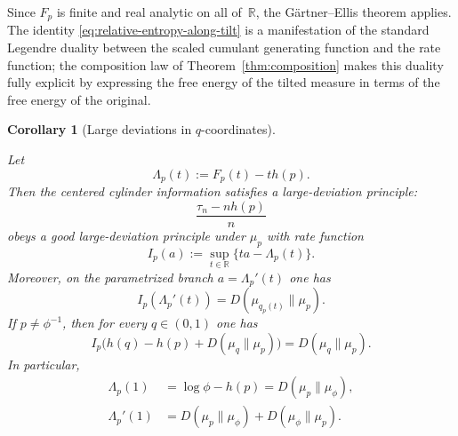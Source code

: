 \documentclass[pdflatex,sn-basic,Numbered]{sn-jnl}
\theoremstyle{thmstyleone}
\newtheorem{corollary}[theorem]{Corollary}
\theoremstyle{thmstyletwo}
\theoremstyle{thmstylethree}
\newcommand{\RR}{\mathbb{R}}
\newcommand{\leanverified}[1]{}
\begin{document}
Since $F_p$ is finite and real analytic on all of~$\RR$, the G\"artner--Ellis theorem applies. The identity \eqref{eq:relative-entropy-along-tilt} is a manifestation of the standard Legendre duality between the scaled cumulant generating function and the rate function; the composition law of Theorem~\ref{thm:composition} makes this duality fully explicit by expressing the free energy of the tilted measure in terms of the free energy of the original.

\begin{corollary}[Large deviations in $q$-coordinates]\label{cor:tilted-ldp}
\leanverified{paper_zero_jitter_tilted_ldp}
Let
\[
\Lambda_p(t):=F_p(t)-t h(p).
\]
Then the centered cylinder information satisfies a large-deviation principle:
\[
\frac{\tau_n-nh(p)}{n}
\]
obeys a good large-deviation principle under $\mu_p$ with rate function
\[
I_p(a):=\sup_{t\in\RR}\{ta-\Lambda_p(t)\}.
\]
Moreover, on the parametrized branch $a=\Lambda_p'(t)$ one has
\begin{equation}\label{eq:parametric-rate}
I_p(\Lambda_p'(t))=D(\mu_{q_p(t)}\|\mu_p).
\end{equation}
If $p\neq \phi^{-1}$, then for every $q\in(0,1)$ one has
\begin{equation}\label{eq:q-coordinate-rate}
I_p\bigl(h(q)-h(p)+D(\mu_q\|\mu_p)\bigr)=D(\mu_q\|\mu_p).
\end{equation}
In particular,
\begin{align}
\Lambda_p(1)&=\log\phi-h(p)=D(\mu_p\|\mu_\phi), \label{eq:lambda1-kl}\\
\Lambda_p'(1)&=D(\mu_p\|\mu_\phi)+D(\mu_\phi\|\mu_p). \label{eq:lambda1-prime-jeffreys}
\end{align}
\end{corollary}
\end{document}
